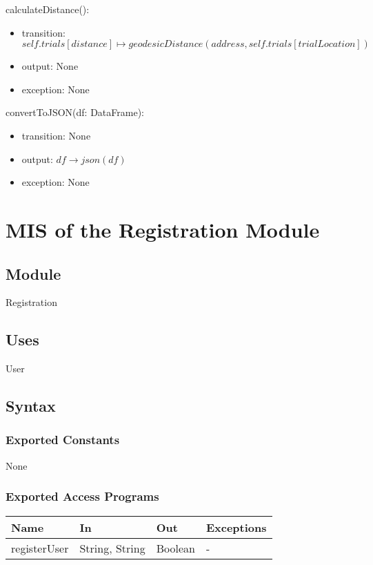 \documentclass[12pt, titlepage]{article}
\begin{document}
\noindent calculateDistance():
\begin{itemize}
\item transition: $self.trials[distance] \mapsto geodesicDistance(address, self.trials[trialLocation])$
\item output: None
\item exception: None
\end{itemize}

\noindent convertToJSON(df: DataFrame):
\begin{itemize}
\item transition: None
\item output:  $df \rightarrow json(df)$
\item exception: None
\end{itemize}

\section{MIS of the Registration Module} \label{Registration}

\subsection{Module}

Registration

\subsection{Uses}

User

\subsection{Syntax}

\subsubsection{Exported Constants}
None

\subsubsection{Exported Access Programs}

\begin{center}
\begin{tabular}{p{4cm} p{4cm} p{4cm} p{4cm}}
\hline
\textbf{Name} & \textbf{In} & \textbf{Out} & \textbf{Exceptions} \\
\hline
registerUser & String, String & Boolean & - \\
\hline
\end{tabular}
\end{center}
\end{document}
